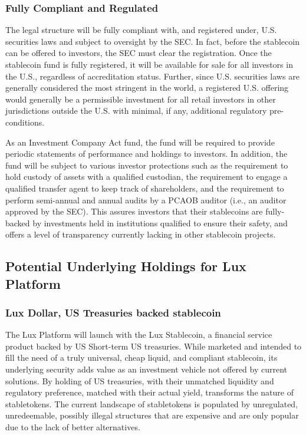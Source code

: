 \documentclass[11pt]{article}
\begin{document}
\subsubsection{Fully Compliant and Regulated}

The legal structure will be fully compliant with, and registered under, U.S. securities laws and subject to oversight by the SEC.  In fact, before the stablecoin can be offered to investors, the SEC must clear the registration.  Once the stablecoin fund is fully registered, it will be available for sale for all investors in the U.S., regardless of accreditation status.  Further, since U.S. securities laws are generally considered the most stringent in the world, a registered U.S. offering would generally be a permissible investment for all retail investors in other jurisdictions outside the U.S. with minimal, if any, additional regulatory pre-conditions.


As an Investment Company Act fund, the fund will be required to provide periodic statements of performance and holdings to investors.  In addition, the fund will be subject to various investor protections such as the requirement to hold custody of assets with a qualified custodian, the requirement to engage a qualified transfer agent to keep track of shareholders, and the requirement to perform semi-annual and annual audits by a PCAOB auditor (i.e., an auditor approved by the SEC).  This assures investors that their stablecoins are fully-backed by investments held in institutions qualified to ensure their safety, and offers a level of transparency currently lacking in other stablecoin projects.


\subsection{Potential Underlying Holdings for Lux Platform}

\subsubsection{Lux Dollar, US Treasuries backed stablecoin}

The Lux Platform will launch with the Lux Stablecoin, a financial service product backed by US Short-term US treasuries. While marketed and intended to fill the need of a truly universal, cheap liquid, and compliant stablecoin, its underlying security adds value as an investment vehicle not offered by current solutions. By holding of US treasuries, with their unmatched liquidity and regulatory preference, matched with their actual yield, transforms the nature of stabletokens. The current landscape of stabletokens is populated by unregulated, unredeemable, possibly illegal structures that are expensive and are only popular due to the lack of better alternatives.
\end{document}

